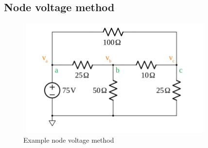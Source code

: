 \documentclass{article}
\begin{document}
\newpage
\subsection{Node voltage method}
\begin{figure}[h]
    \vspace{10mm}
    \centering
    \includegraphics[width=10cm, height=6cm]{image/node-voltage-method.png}
    \caption{Example node voltage method}
\end{figure}
\end{document}
